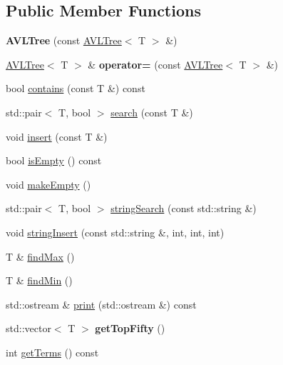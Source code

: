 \subsection*{Public Member Functions}
\begin{DoxyCompactItemize}
\item 
\mbox{\label{classAVLTree_ae060c99e3cbf028cf2cc3dbae477baeb}} 
{\bfseries A\+V\+L\+Tree} (const \mbox{\hyperlink{classAVLTree}{A\+V\+L\+Tree}}$<$ T $>$ \&)
\item 
\mbox{\label{classAVLTree_a323cd174756feb69b5e164d712bfc13f}} 
\mbox{\hyperlink{classAVLTree}{A\+V\+L\+Tree}}$<$ T $>$ \& {\bfseries operator=} (const \mbox{\hyperlink{classAVLTree}{A\+V\+L\+Tree}}$<$ T $>$ \&)
\item 
bool \mbox{\hyperlink{classAVLTree_afe724de4c687945d687d7013f4447d20}{contains}} (const T \&) const
\item 
std\+::pair$<$ T, bool $>$ \mbox{\hyperlink{classAVLTree_abc89056d84bd8b7f625f0716788154fb}{search}} (const T \&)
\item 
void \mbox{\hyperlink{classAVLTree_a5b8d9bac5800aec72c175c74391f7027}{insert}} (const T \&)
\item 
bool \mbox{\hyperlink{classAVLTree_a0203b5672172acbb9085d75f37fb674e}{is\+Empty}} () const
\item 
void \mbox{\hyperlink{classAVLTree_ab7062b17bcc409f0b9200671482fad01}{make\+Empty}} ()
\item 
std\+::pair$<$ T, bool $>$ \mbox{\hyperlink{classAVLTree_a2564e8382d86688fca442f3ef960612d}{string\+Search}} (const std\+::string \&)
\item 
void \mbox{\hyperlink{classAVLTree_a241b96e4c35403cabdc44c4781326721}{string\+Insert}} (const std\+::string \&, int, int, int)
\item 
T \& \mbox{\hyperlink{classAVLTree_a2bae23bdf0a05bdfa8c7b77ea46b5d3e}{find\+Max}} ()
\item 
T \& \mbox{\hyperlink{classAVLTree_a3cb9a9b85e4955d79e706f2e589dfc70}{find\+Min}} ()
\item 
std\+::ostream \& \mbox{\hyperlink{classAVLTree_af5299ff77e912f72481679bf9f380810}{print}} (std\+::ostream \&) const
\item 
\mbox{\label{classAVLTree_afe1878e13d4f856c915cee90dfd60f86}} 
std\+::vector$<$ T $>$ {\bfseries get\+Top\+Fifty} ()
\item 
int \mbox{\hyperlink{classAVLTree_aef337841336fe9e42e4575283139b205}{get\+Terms}} () const
\end{DoxyCompactItemize}
